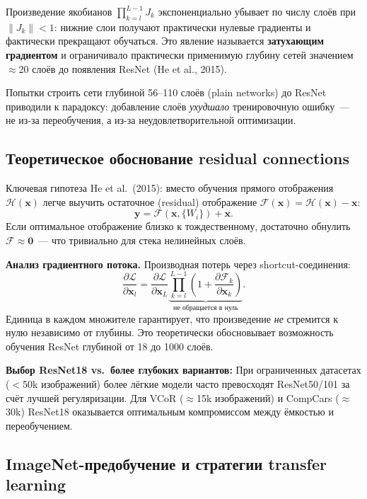 \documentclass[14pt,a4paper]{report}
\numberwithin{equation}{chapter}
\numberwithin{figure}{chapter}
\numberwithin{table}{chapter}
\begin{document}
Произведение якобианов $\prod_{k=l}^{L-1} J_k$ экспоненциально
убывает по числу слоёв при $\|J_k\| < 1$: нижние слои получают
практически нулевые градиенты и фактически прекращают обучаться.
Это явление называется \textbf{затухающим градиентом} и ограничивало
практически применимую глубину сетей значением $\approx$20 слоёв
до появления ResNet (He et al., 2015).

Попытки строить сети глубиной 56--110 слоёв (plain networks) до ResNet
приводили к парадоксу: добавление слоёв \textit{ухудшало} тренировочную
ошибку~--- не из-за переобучения, а из-за неудовлетворительной оптимизации.

\subsection{Теоретическое обоснование residual connections}

Ключевая гипотеза He et al.~(2015): вместо обучения прямого
отображения $\mathcal{H}(\mathbf{x})$ легче выучить остаточное
(residual) отображение $\mathcal{F}(\mathbf{x}) =
\mathcal{H}(\mathbf{x}) - \mathbf{x}$:
\begin{equation}
  \mathbf{y} = \mathcal{F}(\mathbf{x},\{W_i\}) + \mathbf{x}.
\end{equation}
Если оптимальное отображение близко к тождественному,
достаточно обнулить $\mathcal{F} \approx \mathbf{0}$~---
что тривиально для стека нелинейных слоёв.

\textbf{Анализ градиентного потока.}
Производная потерь через shortcut-соединения:
\begin{equation}
  \frac{\partial\mathcal{L}}{\partial\mathbf{x}_l} =
  \frac{\partial\mathcal{L}}{\partial\mathbf{x}_L}
  \underbrace{\prod_{k=l}^{L-1}
    \!\left(1 + \frac{\partial\mathcal{F}_k}{\partial\mathbf{x}_k}
    \right)}_{\text{не обращается в нуль}}.
\end{equation}
Единица в каждом множителе гарантирует, что произведение
\textit{не} стремится к нулю независимо от глубины.
Это теоретически обосновывает возможность обучения ResNet
глубиной от 18 до 1000 слоёв.

\textbf{Выбор ResNet18 vs.\ более глубоких вариантов:}
При ограниченных датасетах ($<$50k изображений) более лёгкие
модели часто превосходят ResNet50/101 за счёт лучшей
регуляризации. Для VCoR ($\approx$15k изображений) и CompCars
($\approx$30k) ResNet18 оказывается оптимальным компромиссом
между ёмкостью и переобучением.

\subsection{ImageNet-предобучение и стратегии transfer learning}
\end{document}
